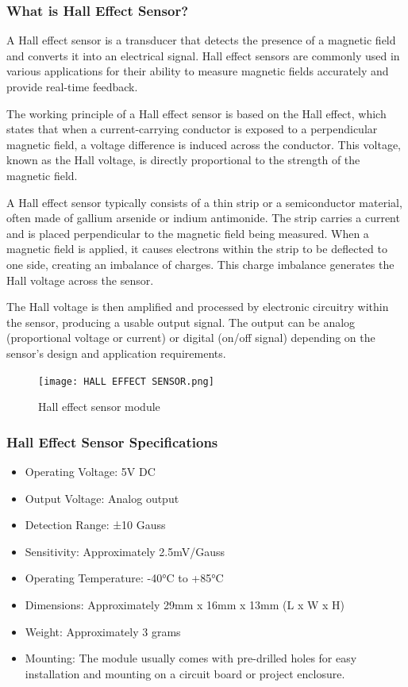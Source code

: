 \documentclass[
12pt,
oneside, 
onehalfspacing, 
nolistspacing, 
parskip, 
chapterinoneline, 
]{AASTCOMPUTER}
\begin{document}
\subsubsection{What is Hall Effect Sensor?}
A Hall effect sensor is a transducer that detects the presence of a magnetic field and converts it into an electrical signal. Hall effect sensors are commonly used in various applications for their ability to measure magnetic fields accurately and provide real-time feedback.

The working principle of a Hall effect sensor is based on the Hall effect, which states that when a current-carrying conductor is exposed to a perpendicular magnetic field, a voltage difference is induced across the conductor. This voltage, known as the Hall voltage, is directly proportional to the strength of the magnetic field.

A Hall effect sensor typically consists of a thin strip or a semiconductor material, often made of gallium arsenide or indium antimonide. The strip carries a current and is placed perpendicular to the magnetic field being measured. When a magnetic field is applied, it causes electrons within the strip to be deflected to one side, creating an imbalance of charges. This charge imbalance generates the Hall voltage across the sensor.

The Hall voltage is then amplified and processed by electronic circuitry within the sensor, producing a usable output signal. The output can be analog (proportional voltage or current) or digital (on/off signal) depending on the sensor's design and application requirements.


\begin{figure}[!ht]
\centering
\texttt{[image: HALL EFFECT SENSOR.png]}
\caption[HALL EFFECT SENSOR]{Hall effect sensor module}
\label{fig:TCU}
\end{figure}

\subsubsection{Hall Effect Sensor Specifications}
\begin{itemize}
\item Operating Voltage: 5V DC
\item Output Voltage: Analog output
\item Detection Range: ±10 Gauss
\item Sensitivity: Approximately 2.5mV/Gauss
\item Operating Temperature: -40°C to +85°C
\item Dimensions: Approximately 29mm x 16mm x 13mm (L x W x H)
\item Weight: Approximately 3 grams
\item Mounting: The module usually comes with pre-drilled holes for easy installation and mounting on a circuit board or project enclosure.
\end{itemize}
\end{document}
